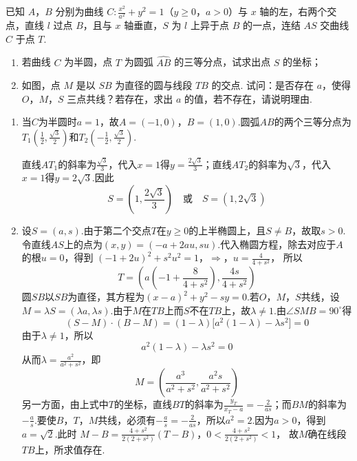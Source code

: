 \begin{problem}
已知 \(A\)，\(B\) 分别为曲线 \(C: \frac{x^2}{a^2} + y^2 = 1\)（\(y \geqslant 0\)，\(a > 0\)）与 \(x\) 轴的左，右两个交点，直线 \(l\) 过点 \(B\)，且与 \(x\) 轴垂直，\(S\) 为 \(l\) 上异于点 \(B\) 的一点，连结 \(AS\) 交曲线 \(C\) 于点 \(T\).

\begin{enumerate}
\item 若曲线 \(C\) 为半圆，点 \(T\) 为圆弧 \( \widehat{AB} \) 的三等分点，试求出点 \(S\) 的坐标；
\item 如图，点 \(M\) 是以 \(SB\) 为直径的圆与线段 \(TB\) 的交点. 试问：是否存在 \(a\)，使得 \(O\)，\(M\)，\(S\) 三点共线？若存在，求出 \(a\) 的值，若不存在，请说明理由.
\end{enumerate}

\begin{solution}
\begin{enumerate}
\item 当\(C\)为半圆时\(a=1\)，故\(A=(-1,0)\)，\(B=(1,0)\).圆弧\(AB\)的两个三等分点为\(T_1\left(\frac{1}{2},\frac{\sqrt{3}}{2}\right)\)和\(T_2\left(-\frac{1}{2},\frac{\sqrt{3}}{2}\right)\).

直线\(AT_1\)的斜率为\(\frac{\sqrt{3}}{3}\)，代入\(x=1\)得\(y=\frac{2\sqrt{3}}{3}\)；直线\(AT_2\)的斜率为\(\sqrt{3}\)，代入\(x=1\)得\(y=2\sqrt{3}\).因此
\[
S=\left(1,\frac{2\sqrt{3}}{3}\right)\quad\text{或}\quad S=(1,2\sqrt{3})
\]

\item 设\(S=(a,s)\).由于第二个交点\(T\)在\(y\geqslant0\)的上半椭圆上，且\(S\neq B\)，故取\(s>0\).令直线\(AS\)上的点为\((x,y)=(-a+2au,su)\).代入椭圆方程，除去对应于\(A\)的根\(u=0\)，得到
\((-1+2u)^2+s^2u^2=1\)，\(\Longrightarrow\)，\(u=\frac{4}{4+s^2}\)，
所以
\[
T=\left(a\left(-1+\frac{8}{4+s^2}\right),\frac{4s}{4+s^2}\right)
\]
圆\(SB\)以\(SB\)为直径，其方程为\((x-a)^2+y^2-sy=0\).若\(O\)，\(M\)，\(S\)共线，设\(M=\lambda S=(\lambda a,\lambda s)\).由于\(M\)在\(TB\)上而\(S\)不在\(TB\)上，故\(\lambda\neq1\).由\(\angle SMB=90^{\circ}\)得
\[
(S-M)\cdot(B-M)=(1-\lambda)\bigl[a^2(1-\lambda)-\lambda s^2\bigr]=0
\]
由于\(\lambda\neq1\)，所以
\[
a^2(1-\lambda)-\lambda s^2=0
\]
从而\(\lambda=\frac{a^2}{a^2+s^2}\)，即
\[
M=\left(\frac{a^3}{a^2+s^2},\frac{a^2s}{a^2+s^2}\right)
\]
另一方面，由上式中\(T\)的坐标，直线\(BT\)的斜率为\(\frac{y_T}{x_T-a}=-\frac{2}{as}\)；而\(BM\)的斜率为\(-\frac{a}{s}\).要使\(B\)，\(T\)，\(M\)共线，必须有\(-\frac{a}{s}=-\frac{2}{as}\)，所以\(a^2=2\).因为\(a>0\)，得到\(a=\sqrt{2}\).此时
\(M-B=\frac{4+s^2}{2(2+s^2)}(T-B)\)，\(0<\frac{4+s^2}{2(2+s^2)}<1\)，
故\(M\)确在线段\(TB\)上，所求值存在.
\end{enumerate}
\end{solution}
\end{problem}

